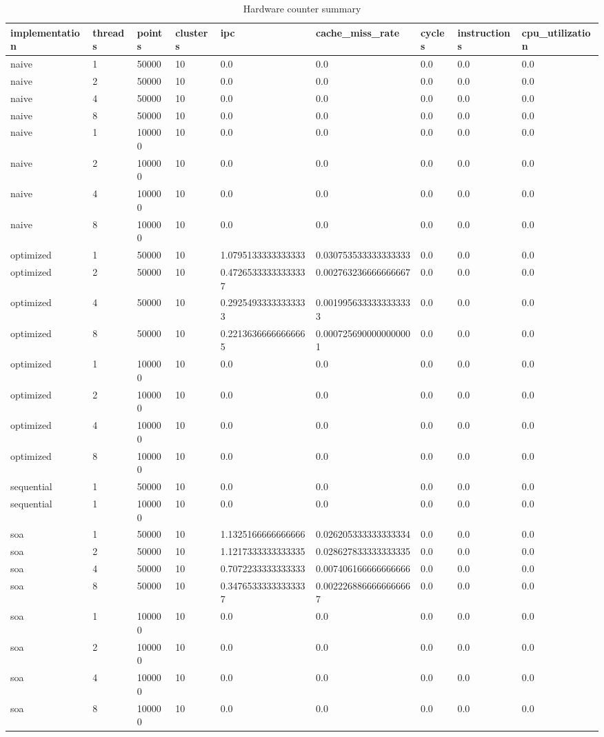 \begin{table}[ht]
\centering
\small
\begin{tabular}{lllllllll}
\hline
implementation & threads & points & clusters & ipc & cache_miss_rate & cycles & instructions & cpu_utilization \\ 
\hline
naive & 1 & 50000 & 10 & 0.0 & 0.0 & 0.0 & 0.0 & 0.0 \\ 
naive & 2 & 50000 & 10 & 0.0 & 0.0 & 0.0 & 0.0 & 0.0 \\ 
naive & 4 & 50000 & 10 & 0.0 & 0.0 & 0.0 & 0.0 & 0.0 \\ 
naive & 8 & 50000 & 10 & 0.0 & 0.0 & 0.0 & 0.0 & 0.0 \\ 
naive & 1 & 100000 & 10 & 0.0 & 0.0 & 0.0 & 0.0 & 0.0 \\ 
naive & 2 & 100000 & 10 & 0.0 & 0.0 & 0.0 & 0.0 & 0.0 \\ 
naive & 4 & 100000 & 10 & 0.0 & 0.0 & 0.0 & 0.0 & 0.0 \\ 
naive & 8 & 100000 & 10 & 0.0 & 0.0 & 0.0 & 0.0 & 0.0 \\ 
optimized & 1 & 50000 & 10 & 1.0795133333333333 & 0.030753533333333333 & 0.0 & 0.0 & 0.0 \\ 
optimized & 2 & 50000 & 10 & 0.47265333333333337 & 0.002763236666666667 & 0.0 & 0.0 & 0.0 \\ 
optimized & 4 & 50000 & 10 & 0.29254933333333333 & 0.0019956333333333333 & 0.0 & 0.0 & 0.0 \\ 
optimized & 8 & 50000 & 10 & 0.22136366666666665 & 0.0007256900000000001 & 0.0 & 0.0 & 0.0 \\ 
optimized & 1 & 100000 & 10 & 0.0 & 0.0 & 0.0 & 0.0 & 0.0 \\ 
optimized & 2 & 100000 & 10 & 0.0 & 0.0 & 0.0 & 0.0 & 0.0 \\ 
optimized & 4 & 100000 & 10 & 0.0 & 0.0 & 0.0 & 0.0 & 0.0 \\ 
optimized & 8 & 100000 & 10 & 0.0 & 0.0 & 0.0 & 0.0 & 0.0 \\ 
sequential & 1 & 50000 & 10 & 0.0 & 0.0 & 0.0 & 0.0 & 0.0 \\ 
sequential & 1 & 100000 & 10 & 0.0 & 0.0 & 0.0 & 0.0 & 0.0 \\ 
soa & 1 & 50000 & 10 & 1.1325166666666666 & 0.026205333333333334 & 0.0 & 0.0 & 0.0 \\ 
soa & 2 & 50000 & 10 & 1.1217333333333335 & 0.028627833333333335 & 0.0 & 0.0 & 0.0 \\ 
soa & 4 & 50000 & 10 & 0.7072233333333333 & 0.007406166666666666 & 0.0 & 0.0 & 0.0 \\ 
soa & 8 & 50000 & 10 & 0.34765333333333337 & 0.0022268866666666667 & 0.0 & 0.0 & 0.0 \\ 
soa & 1 & 100000 & 10 & 0.0 & 0.0 & 0.0 & 0.0 & 0.0 \\ 
soa & 2 & 100000 & 10 & 0.0 & 0.0 & 0.0 & 0.0 & 0.0 \\ 
soa & 4 & 100000 & 10 & 0.0 & 0.0 & 0.0 & 0.0 & 0.0 \\ 
soa & 8 & 100000 & 10 & 0.0 & 0.0 & 0.0 & 0.0 & 0.0 \\ 
\hline
\end{tabular}
\caption{Hardware counter summary}
\label{tab:hardware_summary}
\end{table}
